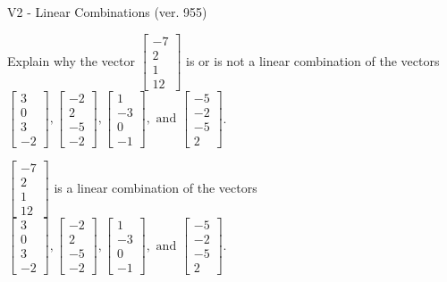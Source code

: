 \begin{exercise}
  \begin{exerciseTitle}V2 - Linear Combinations (ver. 955)\end{exerciseTitle}
  \begin{exerciseStatement}
    Explain why the vector \(\left[\begin{array}{c}
-7 \\
2 \\
1 \\
12
\end{array}\right]\)  is or is not a linear 
	combination of the vectors \(\left[\begin{array}{c}
3 \\
0 \\
3 \\
-2
\end{array}\right] , \left[\begin{array}{c}
-2 \\
2 \\
-5 \\
-2
\end{array}\right] , \left[\begin{array}{c}
1 \\
-3 \\
0 \\
-1
\end{array}\right] , \text{ and } \left[\begin{array}{c}
-5 \\
-2 \\
-5 \\
2
\end{array}\right]\).
	


  \end{exerciseStatement}
  \begin{exerciseAnswer}
   \(\left[\begin{array}{c}
-7 \\
2 \\
1 \\
12
\end{array}\right]\) 
  	 is  
	a linear combination of the vectors \(\left[\begin{array}{c}
3 \\
0 \\
3 \\
-2
\end{array}\right] , \left[\begin{array}{c}
-2 \\
2 \\
-5 \\
-2
\end{array}\right] , \left[\begin{array}{c}
1 \\
-3 \\
0 \\
-1
\end{array}\right] , \text{ and } \left[\begin{array}{c}
-5 \\
-2 \\
-5 \\
2
\end{array}\right]\).


\end{exerciseAnswer}
\end{exercise}
